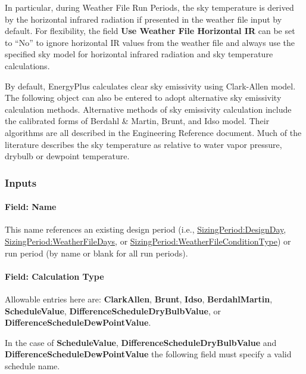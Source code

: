 In particular, during Weather File Run Periods, the sky temperature is derived by the horizontal infrared radiation if presented in the weather file input by default. For flexibility, the field \textbf{Use Weather File Horizontal IR} can be set to ``No'' to ignore horizontal IR values from the weather file and always use the specified sky model for horizontal infrared radiation and sky temperature calculations.

By default, EnergyPlus calculates clear sky emissivity using Clark-Allen model. The following object can also be entered to adopt alternative sky emissivity calculation methods. Alternative methods of sky emissivity calculation include the calibrated forms of Berdahl \& Martin, Brunt, and Idso model. Their algorithms are all described in the Engineering Reference document. Much of the literature describes the sky temperature as relative to water vapor pressure, drybulb or dewpoint temperature.

\subsubsection{Inputs}\label{inputs-8-011}

\paragraph{Field: Name}\label{field-name-7-009}

This name references an existing design period (i.e., \hyperref[sizingperioddesignday]{SizingPeriod:DesignDay}, \hyperref[sizingperiodweatherfiledays]{SizingPeriod:WeatherFileDays}, or \hyperref[sizingperiodweatherfileconditiontype]{SizingPeriod:WeatherFileConditionType}) or run period (by name or blank for all run periods).

\paragraph{Field: Calculation Type}\label{field-calculation-type}

Allowable entries here are: \textbf{ClarkAllen}, \textbf{Brunt}, \textbf{Idso}, \textbf{BerdahlMartin}, \textbf{ScheduleValue}, \textbf{DifferenceScheduleDryBulbValue}, or \textbf{DifferenceScheduleDewPointValue}.

In the case of \textbf{ScheduleValue}, \textbf{DifferenceScheduleDryBulbValue} and \textbf{DifferenceScheduleDewPointValue} the following field must specify a valid schedule name.

